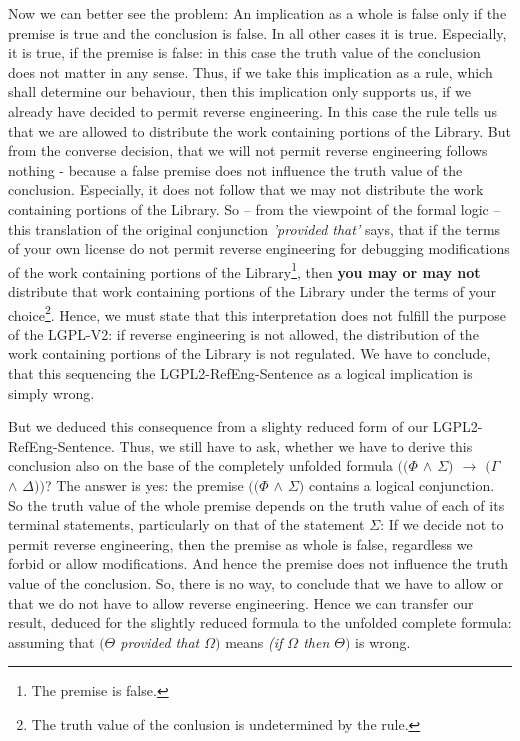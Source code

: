 Now we can better see the problem: An implication as a whole is false only if
the premise is true and the conclusion is false. In all other cases it is true.
Especially, it is true, if the premise is false: in this case the truth value of
the conclusion does not matter in any sense. Thus, if we take this implication
as a rule, which shall determine our behaviour, then this implication only
supports us, if we already have decided to permit reverse engineering. In this
case the rule tells us that we are allowed to distribute the work containing
portions of the Library. But from the converse decision, that we will not permit
reverse engineering follows nothing - because a false premise does not influence
the truth value of the conclusion. Especially, it does not follow that we may
not distribute the work containing portions of the Library. So -- from the
viewpoint of the formal logic -- this translation of the original conjunction 
\emph{'provided that'} says, that if the terms of your own license do not permit
reverse engineering for debugging modifications of the work containing portions
of the Library\footnote{The premise is false.}, then \textbf{you may or may not}
distribute that work containing portions of the Library under the terms of your
choice\footnote{The truth value of the conlusion is undetermined by the rule.}.
Hence, we must state that this interpretation does not fulfill the purpose of
the LGPL-V2: if reverse engineering is not allowed, the distribution of the work
containing portions of the Library is not regulated. We have to conclude, that
this sequencing the LGPL2-RefEng-Sentence as a logical implication is simply
wrong.

But we deduced this consequence from a slighty reduced form of our
LGPL2-RefEng-Sentence. Thus, we still have to ask, whether we have to derive
this conclusion also on the base of the completely unfolded formula
\emph{$((\Phi$ $\wedge$ $\Sigma)$ $\rightarrow$ $(\Gamma$ $\wedge$ $\Delta))$}?
The answer is yes: the premise \emph{$((\Phi$ $\wedge$ $\Sigma)$} contains a
logical conjunction. So the truth value of the whole premise depends on the
truth value of each of its terminal statements, particularly on that of the
statement $\Sigma$: If we decide not to permit reverse engineering, then the
premise as whole is false, regardless we forbid or allow modifications. And
hence the premise does not influence the truth value of the conclusion. So,
there is no way, to conclude that we have to allow or that we do not have to
allow reverse engineering. Hence we can transfer our result, deduced for the
slightly reduced formula to the unfolded complete formula: assuming that
\emph{$(\Theta$ provided that $\Omega)$} means \emph{(if $\Omega$ then
$\Theta)$} is wrong.

